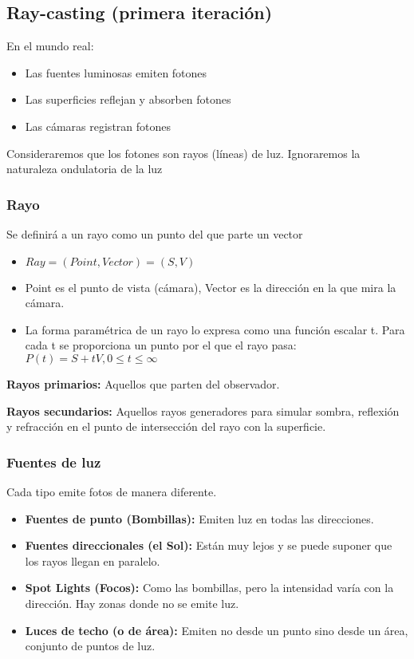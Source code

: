 \subsection{Ray-casting (primera iteración)}
En el mundo real:
\begin{itemize}
    \item Las fuentes luminosas emiten fotones
    \item Las superficies reflejan y absorben fotones
    \item Las cámaras registran fotones
\end{itemize}

Consideraremos que los fotones son rayos (líneas) de luz. Ignoraremos la naturaleza ondulatoria de la luz

\subsubsection{Rayo}
Se definirá a un rayo como un punto del que parte un vector
\begin{itemize}
    \item $Ray = (Point, Vector) = (S, V)$
    \item Point es el punto de vista (cámara), Vector es la dirección en la que mira la cámara.
    \item La forma paramétrica de un rayo lo expresa como una función escalar t. Para cada t se proporciona un punto por el que el rayo pasa: $P(t)=S+tV, 0 \leq t \leq \infty$
\end{itemize}

\textbf{Rayos primarios:} Aquellos que parten del observador.

\textbf{Rayos secundarios:} Aquellos rayos generadores para simular sombra, reflexión y refracción en el punto de intersección del rayo con la superficie.

\subsubsection{Fuentes de luz} 
Cada tipo emite fotos de manera diferente.
\begin{itemize}
    \item \textbf{Fuentes de punto (Bombillas):} Emiten luz en todas las direcciones.
    \item \textbf{Fuentes direccionales (el Sol):} Están muy lejos y se puede suponer que los rayos llegan en paralelo.
    \item \textbf{Spot Lights (Focos):} Como las bombillas, pero la intensidad varía con la dirección. Hay zonas donde no se emite luz.
    \item \textbf{Luces de techo (o de área):} Emiten no desde un punto sino desde un área, conjunto de puntos de luz.
\end{itemize}
\pagebreak

